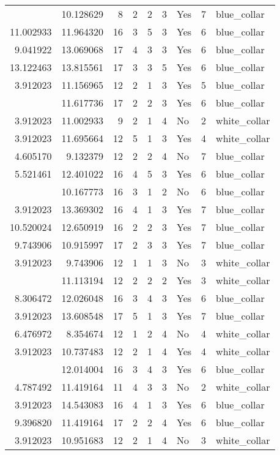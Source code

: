 \documentclass[
]{article}
\begin{document}
\begin{longtable}[t]{rrrrrllrl}
\addlinespace
9.905984 & 10.128629 & 8 & 2 & 2 & 3 & Yes & 7 & blue\_collar\\
11.002933 & 11.964320 & 16 & 3 & 5 & 3 & Yes & 6 & blue\_collar\\
9.041922 & 13.069068 & 17 & 4 & 3 & 3 & Yes & 6 & blue\_collar\\
13.122463 & 13.815561 & 17 & 3 & 3 & 5 & Yes & 6 & blue\_collar\\
3.912023 & 11.156965 & 12 & 2 & 1 & 3 & Yes & 5 & blue\_collar\\
\addlinespace
8.787220 & 11.617736 & 17 & 2 & 2 & 3 & Yes & 6 & blue\_collar\\
3.912023 & 11.002933 & 9 & 2 & 1 & 4 & No & 2 & white\_collar\\
3.912023 & 11.695664 & 12 & 5 & 1 & 3 & Yes & 4 & white\_collar\\
4.605170 & 9.132379 & 12 & 2 & 2 & 4 & No & 7 & blue\_collar\\
5.521461 & 12.401022 & 16 & 4 & 5 & 3 & Yes & 6 & blue\_collar\\
\addlinespace
3.912023 & 10.167773 & 16 & 3 & 1 & 2 & No & 6 & blue\_collar\\
3.912023 & 13.369302 & 16 & 4 & 1 & 3 & Yes & 7 & blue\_collar\\
10.520024 & 12.650919 & 16 & 2 & 2 & 3 & Yes & 7 & blue\_collar\\
9.743906 & 10.915997 & 17 & 2 & 3 & 3 & Yes & 7 & blue\_collar\\
3.912023 & 9.743906 & 12 & 1 & 1 & 3 & No & 3 & white\_collar\\
\addlinespace
7.047517 & 11.113194 & 12 & 2 & 2 & 2 & Yes & 3 & white\_collar\\
8.306472 & 12.026048 & 16 & 3 & 4 & 3 & Yes & 6 & blue\_collar\\
3.912023 & 13.608548 & 17 & 5 & 1 & 3 & Yes & 7 & blue\_collar\\
6.476972 & 8.354674 & 12 & 1 & 2 & 4 & No & 4 & white\_collar\\
3.912023 & 10.737483 & 12 & 2 & 1 & 4 & Yes & 4 & white\_collar\\
\addlinespace
11.408120 & 12.014004 & 16 & 3 & 4 & 3 & Yes & 6 & blue\_collar\\
4.787492 & 11.419164 & 11 & 4 & 3 & 3 & No & 2 & white\_collar\\
3.912023 & 14.543083 & 16 & 4 & 1 & 3 & Yes & 6 & blue\_collar\\
9.396820 & 11.419164 & 17 & 2 & 2 & 4 & Yes & 6 & blue\_collar\\
3.912023 & 10.951683 & 12 & 2 & 1 & 4 & No & 3 & white\_collar\\

\end{longtable}
\end{document}
